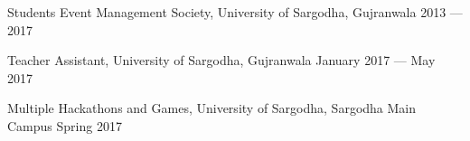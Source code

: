 Students Event Management Society, University of Sargodha, Gujranwala	\hfill 2013 --- 2017
 
Teacher Assistant, University of Sargodha, Gujranwala	\hfill January 2017 --- May 2017

Multiple Hackathons and Games, University of Sargodha, Sargodha Main Campus	\hfill Spring 2017
